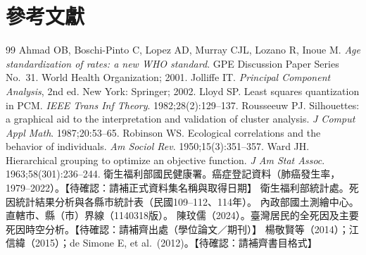 \documentclass[UTF8,a4paper,11pt]{ctexart}
\newcommand{\note}[1]{\textcolor{red!60!black}{【待確認：#1】}}
\begin{document}
\section*{參考文獻}
\begin{small}
\begin{thebibliography}{99}
   Ahmad OB, Boschi-Pinto C, Lopez AD, Murray CJL, Lozano R, Inoue M. \emph{Age standardization of rates: a new WHO standard}. GPE Discussion Paper Series No.\ 31. World Health Organization; 2001.
   Jolliffe IT. \emph{Principal Component Analysis}, 2nd ed. New York: Springer; 2002.
   Lloyd SP. Least squares quantization in PCM. \emph{IEEE Trans Inf Theory}. 1982;28(2):129--137.
   Rousseeuw PJ. Silhouettes: a graphical aid to the interpretation and validation of cluster analysis. \emph{J Comput Appl Math}. 1987;20:53--65.
   Robinson WS. Ecological correlations and the behavior of individuals. \emph{Am Sociol Rev}. 1950;15(3):351--357.
   Ward JH. Hierarchical grouping to optimize an objective function. \emph{J Am Stat Assoc}. 1963;58(301):236--244.
   衛生福利部國民健康署。癌症登記資料（肺癌發生率，1979--2022）。\note{請補正式資料集名稱與取得日期}
   衛生福利部統計處。死因統計結果分析與各縣市統計表（民國109--112、114年）。
   內政部國土測繪中心。直轄市、縣（市）界線（1140318版）。
   陳玟儒（2024）。臺灣居民的全死因及主要死因時空分析。\note{請補齊出處（學位論文／期刊）}
   楊敬賢等（2014）；江信緯（2015）；de Simone E, et al.\ (2012)。\note{請補齊書目格式}
\end{thebibliography}
\end{small}

\appendix
\end{document}
